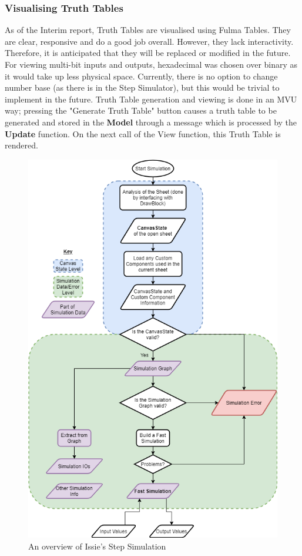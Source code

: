 \subsubsection{Visualising Truth Tables}
As of the Interim report, Truth Tables are visualised using Fulma Tables. They are clear, responsive and do a good job overall. However, they lack interactivity. Therefore, it is anticipated that they will be replaced or modified in the future. For viewing multi-bit inputs and outputs, hexadecimal was chosen over binary as it would take up less physical space. Currently, there is no option to change number base (as there is in the Step Simulator), but this would be trivial to implement in the future. Truth Table generation and viewing is done in an MVU way; pressing the "Generate Truth Table" button causes a truth table to be generated and stored in the \textbf{Model} through a message which is processed by the \textbf{Update} function. On the next call of the View function, this Truth Table is rendered.


\begin{figure} [h!]
    \centering
    \includegraphics[width=\textwidth]{04.ImpPlan/IssieSim.png}
    \caption{An overview of Issie's Step Simulation}
    \label{fig:flowchartSim}
\end{figure}

